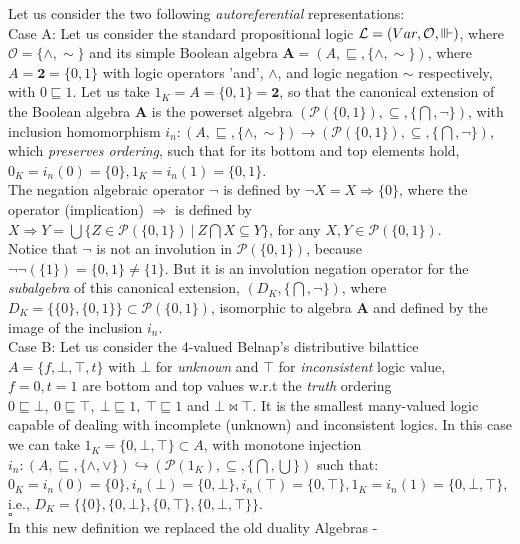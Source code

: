 \documentclass[10pt,twocolumn]{article}
\renewcommand{\O}{\mathcal{O}} \renewcommand{\P}{\mathcal{P}}
\begin{document}
 Let us consider the two following \emph{autoreferential} representations:\\ Case A: Let us consider the standard propositional logic $\L = (Var, \O,
\Vvdash)$, where $\O = \{\wedge, \sim\}$ and its simple Boolean
algebra $\textbf{A} = (A,\sqsubseteq, \{\wedge, \sim\})$, where $A =
\textbf{2} = \{0,1\}$ with logic operators 'and', $\wedge$, and
logic negation $\sim$ respectively, with $0 \sqsubseteq 1$. Let us
take $1_K = A = \{0,1\}= \textbf{2}$, so that the canonical
extension of the Boolean algebra $\textbf{A}$ is the powerset
algebra $(\P(\{0,1\}), \subseteq, \{\bigcap, \neg\})$, with
inclusion homomorphism $i_n:(A, \sqsubseteq, \{\wedge, \sim\})
\rightarrow (\P(\{0,1\}), \subseteq, \{\bigcap, \neg \})$, which
\emph{preserves ordering}, such that for its bottom and top
elements hold, $0_K = i_n(0) =  \{0\}, 1_K = i_n(1) = \{0,1\}$.\\
The negation algebraic operator $\neg$ is defined by $\neg X = X
\Rightarrow \{0\}$, where the operator (implication) $\Rightarrow$
is defined by $X\Rightarrow Y = \bigcup\{Z\in \P(\{0,1\})~|~Z
\bigcap X \subseteq Y\}$, for any $ X,Y \in
\P(\{0,1\})$.\\
Notice that $\neg$ is not an involution in $\P(\{0,1\})$, because
$\neg \neg(\{1\}) = \{0,1\} \neq  \{1\}$. But it is an involution
negation operator for the  \emph{subalgebra} of this canonical
extension, $(D_K, \{\bigcap, \neg \})$, where $D_K =\{\{0\}
,\{0,1\}\} \subset \P(\{0,1\})$, isomorphic to  algebra $\textbf{A}$
and
defined by the image of the inclusion  $i_n$.\\
Case B:  Let us consider the 4-valued Belnap's distributive
bilattice $A = \{f,\bot, \top, t\}$ with $\bot$ for \emph{unknown}
and $\top$ for \emph{inconsistent} logic value, $f = 0, t = 1$ are
bottom and top values w.r.t the \emph{truth} ordering  $0
\sqsubseteq \bot, ~0 \sqsubseteq \top, ~\bot \sqsubseteq 1, ~\top
\sqsubseteq 1$ and $\bot \bowtie \top$. It is the smallest
many-valued logic capable of dealing with incomplete (unknown) and
inconsistent logics. In this case we can take $1_K = \{0,\bot,
\top\} \subset A$, with monotone injection $i_n:(A, \sqsubseteq,
\{\wedge, \vee\}) \hookrightarrow (\P(1_K), \subseteq,
\{\bigcap,\bigcup\})$ such that: $0_K = i_n(0) = \{0\}, i_n(\bot) =
\{0, \bot\},  i_n(\top) = \{0, \top\}, 1_K = i_n(1) = \{0, \bot,
\top\}$, i.e., $D_K = \{\{0\}, \{0, \bot\}, \{0, \top\}, \{0, \bot,
\top\}\}$.
\\$\square$\\
In this new definition we replaced the old duality Algebras -
\end{document}

